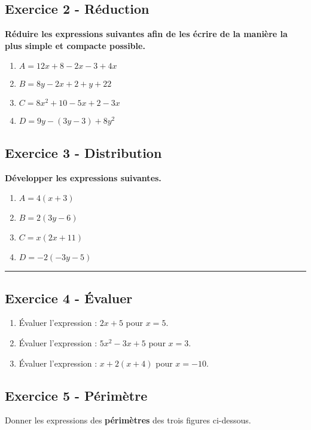 \documentclass[12pt]{article}
\newcommand{\horrule}[1]{\rule{\linewidth}{#1}} %
\begin{document}
\begin{multicols}{2}

  \subsection*{Exercice 2 - Réduction}
  \textbf{Réduire les expressions suivantes afin de les écrire de la manière la plus simple et compacte possible.}

  \begin{enumerate}
  \item $A = 12x + 8 - 2x - 3 + 4x$
  \item $B = 8y -2x + 2 + y + 22$
  \item $C = 8x^2 + 10 - 5x + 2 - 3x$ 
  \item $D = 9y - (3y -3) + 8y^2$
  \end{enumerate}

  \subsection*{Exercice 3 - Distribution}

  \textbf{Développer les expressions suivantes.}
  \begin{enumerate}
  \item $A = 4(x + 3)$
  \item $B = 2(3y - 6)$
  \item $C = x(2x +11)$ 
  \item $D = -2(-3y - 5)$
  \end{enumerate}

\end{multicols}

\horrule{1px}

\begin{multicols}{2}
  \subsection*{Exercice 4 - Évaluer}

  \begin{enumerate}
  \item Évaluer l'expression : $2x +5$ pour $x = 5$.
  \item Évaluer l'expression : $5x^2 - 3x + 5$ pour $x = 3$.
  \item Évaluer l'expression : $x + 2(x + 4)$ pour $x = -10$.
  \end{enumerate}

  \subsection*{Exercice 5 - Périmètre}

  Donner les expressions des \textbf{périmètres} des trois figures ci-dessous.

\end{multicols}
\end{document}
